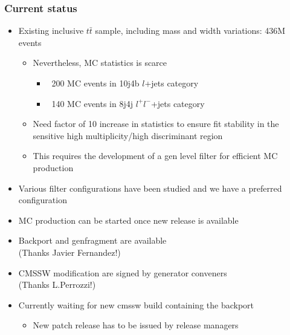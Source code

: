 \documentclass{beamer}
\begin{document}
\begin{frame}[label=mcsample]
\begin{table}[hbt]
{\begin{tabular}
\end{tabular}
}
\end{table}

\end{frame}


\begin{frame}[label=newsample]
\frametitle{{Current status}}
\begin{itemize}
\item Existing inclusive $t\bar{t}$ sample, including mass and width variations: 436M events
\begin{itemize}
\item Nevertheless, MC statistics is scarce
\begin{itemize}
\item ~200 MC events in 10j4b $l$+jets category
\item ~140 MC events in 8j4j $l^+l^-$+jets category
\end{itemize}
\item Need factor of 10 increase in statistics to ensure fit stability in the sensitive high multiplicity/high discriminant region
\item This requires the development of a gen level filter for efficient MC production
\end{itemize}
\end{itemize}
\begin{itemize}
\item Various filter configurations have been studied and we have a preferred configuration
\end{itemize}
\begin{itemize}
\item MC production can be started once new release is available
\item Backport and genfragment are available \\(Thanks Javier Fernandez!)
\item CMSSW modification are signed by generator conveners \\(Thanks L.Perrozzi!)
\item Currently waiting for new cmssw build containing the backport
\begin{itemize}
\item New patch release has to be issued by release managers
\end{itemize}
\end{itemize}
\end{frame}
\end{document}

